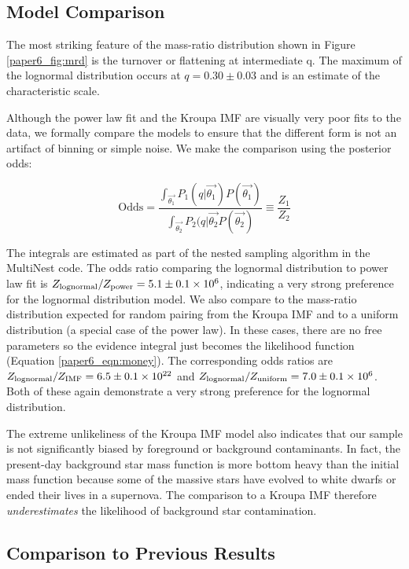 \subsection{Model Comparison}

The most striking feature of the mass-ratio distribution shown in Figure \ref{paper6_fig:mrd} is the turnover or flattening at intermediate q. The maximum of the lognormal distribution occurs at $q = 0.30 \pm 0.03$ and is an estimate of the characteristic scale.

Although the power law fit and the Kroupa IMF are visually very poor fits to the data, we formally compare the models to ensure that the different form is not an artifact of binning or simple noise. We make the comparison using the posterior odds:

\begin{equation}
\mathrm{Odds} = \frac{\int_{\vec{\theta_1}} P_1(q|\vec{\theta_1}) P(\vec{\theta_1})}{\int_{\vec{\theta_2}} P_2(q|\vec{\theta_2}  P(\vec{\theta_2})} \equiv \frac{Z_1}{Z_2}
\end{equation}

The integrals are estimated as part of the nested sampling algorithm in the MultiNest code. The odds ratio comparing the lognormal distribution to power law fit is $Z_\mathrm{lognormal} / Z_\mathrm{power} = 5.1 \pm 0.1 \times 10^{6}$, indicating a very strong preference for the lognormal distribution model. We also compare to the mass-ratio distribution expected for random pairing from the Kroupa IMF and to a uniform distribution (a special case of the power law). In these cases, there are no free parameters so the evidence integral just becomes the likelihood function (Equation \ref{paper6_eqn:money}). The corresponding odds ratios are  $Z_\mathrm{lognormal} / Z_\mathrm{IMF} = 6.5 \pm 0.1 \times 10^{22}$ and $Z_\mathrm{lognormal} / Z_\mathrm{uniform} = 7.0 \pm 0.1 \times 10^{6}$. Both of these again demonstrate a very strong preference for the lognormal distribution. 

The extreme unlikeliness of the Kroupa IMF model also indicates that our sample is not significantly biased by foreground or background contaminants. In fact, the present-day background star mass function is more bottom heavy than the initial mass function because some of the massive stars have evolved to white dwarfs or ended their lives in a supernova. The comparison to a Kroupa IMF therefore \emph{underestimates} the likelihood of background star contamination.


\subsection{Comparison to Previous Results}

